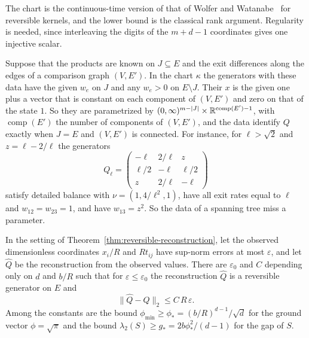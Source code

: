 The chart is the continuous-time version of that of Wolfer and
Watanabe~\cite[Theorems~3, 5 and~6]{wolferwatanabe2021} for reversible kernels, and the lower
bound is the classical rank argument. Regularity is needed, since interleaving the digits of
the $m+d-1$ coordinates gives one injective scalar.

\begin{remark}\label{rem:partial-data}
Suppose that the products are known on $J\subseteq E$ and the exit differences along the edges
of a comparison graph $(V,E')$. In the chart $\kappa$ the generators with these data have the
given $w_e$ on $J$ and any $w_e>0$ on $E\setminus J$. Their $x$ is the given one plus a vector
that is constant on each component of $(V,E')$ and zero on that of the state $1$. So they
are parametrized by $(0,\infty)^{m-|J|}\times\mathbb{R}^{\operatorname{comp}(E')-1}$, with
$\operatorname{comp}(E')$ the number of components of $(V,E')$, and the data identify $Q$ exactly
when $J=E$ and $(V,E')$ is connected. For instance, for
$\ell>\sqrt2$ and $z=\ell-2/\ell$ the generators
\[
 Q_\ell=\begin{pmatrix}-\ell&2/\ell&z\\ \ell/2&-\ell&\ell/2\\ z&2/\ell&-\ell\end{pmatrix}
\]
satisfy detailed balance with $\nu=(1,4/\ell^2,1)$, have all exit rates equal to $\ell$ and
$w_{12}=w_{23}=1$, and have $w_{13}=z^2$. So the data of a spanning tree miss a parameter.
\end{remark}

\begin{theorem}[stability]\label{thm:stability}
In the setting of Theorem~\ref{thm:reversible-reconstruction}, let the observed dimensionless
coordinates $x_i/R$ and $Rt_{ij}$ have sup-norm errors at most $\varepsilon$, and let
$\widehat Q$ be the reconstruction from the observed values. There are $\varepsilon_0$ and $C$
depending only on $d$ and $b/R$ such that for $\varepsilon\le\varepsilon_0$ the reconstruction
$\widehat Q$ is a reversible generator on $E$ and
\[
 \|\widehat Q-Q\|_2\le C\,R\,\varepsilon .
\]
Among the constants are the bound $\phi_{\min}\ge \phi_*=(b/R)^{d-1}/\sqrt d$ for the ground
vector $\phi=\sqrt\pi$ and the bound $\lambda_2(S)\ge g_*=2b\phi_*^2/(d-1)$ for the gap of $S$.
\end{theorem}

